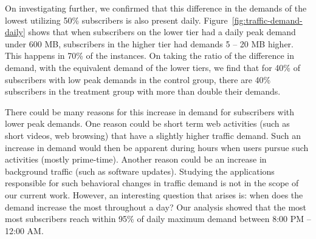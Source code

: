 On investigating further, we confirmed that this difference in the demands
of the lowest utilizing 50\% subscribers is also present daily.
Figure~\ref{fig:traffic-demand-daily} shows that when subscribers on the
lower tier had a daily peak demand under 600 MB, subscribers in the higher
tier had demands 5 -- 20 MB higher. This happens in 70\% of the instances.
On taking the ratio of the difference in demand, with the equivalent demand
of the lower tiers, we find that for 40\% of subscribers with low peak demands
in the control group, there are 40\% subscribers in the treatment group with
more than double their demands.

There could be many reasons for this increase in demand for subscribers with
lower peak demands. One reason could be short term web activities (such as short videos,
web browsing) that have a slightly higher traffic demand. Such an increase in demand would
then be apparent during hours when users pursue such activities (mostly prime-time).
Another reason could be an increase in background traffic (such as software updates).
Studying the applications responsible for such behavioral changes in traffic demand is not
in the scope of our current work. However, an interesting question that arises is: when
does the demand increase the most throughout a day? Our analysis showed that the most
most subscribers reach within 95\% of daily maximum demand between 8:00 PM -- 12:00 AM.


